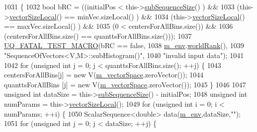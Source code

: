 \begin{DoxyCode}
1031 \{
1032   \textcolor{keywordtype}{bool} bRC = ((initialPos               <  this->\hyperlink{class_q_u_e_s_o_1_1_sequence_of_vectors_a0224bd3e961d86af5d2886301c0c2b86}{subSequenceSize}() ) &&
1033               (this->\hyperlink{class_q_u_e_s_o_1_1_base_vector_sequence_a2fefedf9e5b90f22881103b3f92555f6}{vectorSizeLocal}()  == minVec.sizeLocal()      ) &&
1034               (this->\hyperlink{class_q_u_e_s_o_1_1_base_vector_sequence_a2fefedf9e5b90f22881103b3f92555f6}{vectorSizeLocal}()  == maxVec.sizeLocal()      ) &&
1035               (0                        <  centersForAllBins.size()) &&
1036               (centersForAllBins.size() == quanttsForAllBins.size()));
1037   \hyperlink{_defines_8h_a56d63d18d0a6d45757de47fcc06f574d}{UQ\_FATAL\_TEST\_MACRO}(bRC == \textcolor{keyword}{false},
1038                       \hyperlink{class_q_u_e_s_o_1_1_base_vector_sequence_a8e8824d2a63c5a43bcc6473e3a0491e8}{m\_env}.\hyperlink{class_q_u_e_s_o_1_1_base_environment_a78b57112bbd0e6dd0e8afec00b40ffa7}{worldRank}(),
1039                       \textcolor{stringliteral}{"SequenceOfVectors<V,M>::subHistogram()"},
1040                       \textcolor{stringliteral}{"invalid input data"});
1041 
1042   \textcolor{keywordflow}{for} (\textcolor{keywordtype}{unsigned} \textcolor{keywordtype}{int} j = 0; j < quanttsForAllBins.size(); ++j) \{
1043     centersForAllBins[j] = \textcolor{keyword}{new} V(\hyperlink{class_q_u_e_s_o_1_1_base_vector_sequence_a4bd171e39ed050ff105c808336f35198}{m\_vectorSpace}.zeroVector());
1044     quanttsForAllBins [j] = \textcolor{keyword}{new} V(\hyperlink{class_q_u_e_s_o_1_1_base_vector_sequence_a4bd171e39ed050ff105c808336f35198}{m\_vectorSpace}.zeroVector());
1045   \}
1046 
1047   \textcolor{keywordtype}{unsigned} \textcolor{keywordtype}{int} dataSize = this->\hyperlink{class_q_u_e_s_o_1_1_sequence_of_vectors_a0224bd3e961d86af5d2886301c0c2b86}{subSequenceSize}() - initialPos;
1048   \textcolor{keywordtype}{unsigned} \textcolor{keywordtype}{int} numParams = this->\hyperlink{class_q_u_e_s_o_1_1_base_vector_sequence_a2fefedf9e5b90f22881103b3f92555f6}{vectorSizeLocal}();
1049   \textcolor{keywordflow}{for} (\textcolor{keywordtype}{unsigned} \textcolor{keywordtype}{int} i = 0; i < numParams; ++i) \{
1050     ScalarSequence<double> data(\hyperlink{class_q_u_e_s_o_1_1_base_vector_sequence_a8e8824d2a63c5a43bcc6473e3a0491e8}{m\_env},dataSize,\textcolor{stringliteral}{""});
1051     \textcolor{keywordflow}{for} (\textcolor{keywordtype}{unsigned} \textcolor{keywordtype}{int} j = 0; j < dataSize; ++j) \{

\end{DoxyCode}
